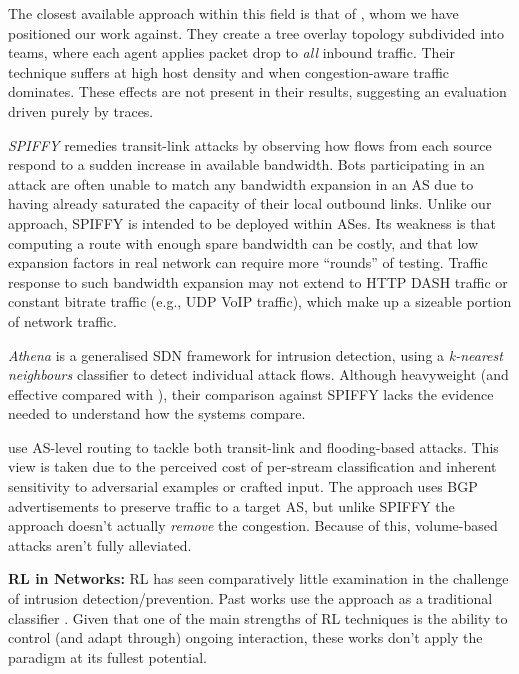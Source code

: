 \documentclass[10pt, times, conference, letterpaper]{IEEEtran}
\newcommand{\fakepara}[1]{\noindent\textbf{#1:}}
\begin{document}
The closest available approach within this field is that of \textcite{DBLP:journals/eaai/MalialisK15}, whom we have positioned our work against.
They create a tree overlay topology subdivided into teams, where each agent applies packet drop to \emph{all} inbound traffic.
Their technique suffers at high host density and when congestion-aware traffic dominates.
These effects are not present in their results, suggesting an evaluation driven purely by traces.

\emph{SPIFFY} \cite{DBLP:conf/ndss/KangGS16} remedies transit-link attacks by observing how flows from each source respond to a sudden increase in available bandwidth.
Bots participating in an attack are often unable to match any bandwidth expansion in an AS due to having already saturated the capacity of their local outbound links.
Unlike our approach, SPIFFY is intended to be deployed within ASes.
Its weakness is that computing a route with enough spare bandwidth can be costly, and that low expansion factors in real network can require more ``rounds'' of testing. 
Traffic response to such bandwidth expansion may not extend to HTTP DASH traffic or constant bitrate traffic (e.g., UDP VoIP traffic), which make up a sizeable portion of network traffic.

\emph{Athena} \cite{DBLP:conf/dsn/LeeKSPY17} is a generalised SDN framework for intrusion detection, using a \emph{k-nearest neighbours} classifier to detect individual attack flows.
Although heavyweight (and effective compared with \textcite{DBLP:conf/lcn/BragaMP10}), their comparison against SPIFFY lacks the evidence needed to understand how the systems compare.

\Textcite{DBLP:conf/sp/SmithS18} use AS-level routing to tackle both transit-link and flooding-based attacks.
This view is taken due to the perceived cost of per-stream classification and inherent sensitivity to adversarial examples or crafted input.
The approach uses BGP advertisements to preserve traffic to a target AS, but unlike SPIFFY the approach doesn't actually \emph{remove} the congestion.
Because of this, volume-based attacks aren't fully alleviated.

\fakepara{RL in Networks}
RL has seen comparatively little examination in the challenge of intrusion detection/prevention.
Past works use the approach as a traditional classifier \cite{shamshirband2014anomaly,DBLP:conf/mates/ServinK08}.
Given that one of the main strengths of RL techniques is the ability to control (and adapt through) ongoing interaction, these works don't apply the paradigm at its fullest potential.
\end{document}
